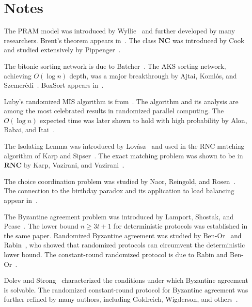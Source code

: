 \documentclass[twoside,12pt]{book}
\theoremstyle{plain}
\theoremstyle{definition}
\theoremstyle{remark}
\begin{document}


\section*{Notes}
\label{sec:parallel-notes}

\begin{enumerate}[label={[\arabic*]}]
\item The PRAM model was introduced by Wyllie~\cite{wyllie1979complexity} and further developed by many researchers. Brent's theorem appears in~\cite{brent1974parallel}. The class $\mathbf{NC}$ was introduced by Cook~\cite{cook1983parallel} and studied extensively by Pippenger~\cite{pippenger1979parallel}.
\item The bitonic sorting network is due to Batcher~\cite{batcher1968sorting}. The AKS sorting network, achieving $O(\log n)$ depth, was a major breakthrough by Ajtai, Koml\'{o}s, and Szemer\'{e}di~\cite{ajtai1983sorting}. BoxSort appears in~\cite{leighton1992introduction}.
\item Luby's randomized MIS algorithm is from~\cite{luby1986simple}. The algorithm and its analysis are among the most celebrated results in randomized parallel computing. The $O(\log n)$ expected time was later shown to hold with high probability by Alon, Babai, and Itai~\cite{alon1986fast}.
\item The Isolating Lemma was introduced by Lov\'{a}sz~\cite{lovasz1979deterministic} and used in the RNC matching algorithm of Karp and Sipser~\cite{karp1981maximum}. The exact matching problem was shown to be in $\mathbf{RNC}$ by Karp, Vazirani, and Vazirani~\cite{karp1990randomized}.
\item The choice coordination problem was studied by Naor, Reingold, and Rosen~\cite{naor1999randomized}. The connection to the birthday paradox and its application to load balancing appear in~\cite{naor1995choice}.
\item The Byzantine agreement problem was introduced by Lamport, Shostak, and Pease~\cite{lamport1982byzantine}. The lower bound $n \geq 3t + 1$ for deterministic protocols was established in the same paper. Randomized Byzantine agreement was studied by Ben-Or~\cite{benor1983another} and Rabin~\cite{rabin1983randomized}, who showed that randomized protocols can circumvent the deterministic lower bound. The constant-round randomized protocol is due to Rabin and Ben-Or~\cite{rabin1983randomized}.
\item Dolev and Strong~\cite{dolev1983short} characterized the conditions under which Byzantine agreement is solvable. The randomized constant-round protocol for Byzantine agreement was further refined by many authors, including Goldreich, Wigderson, and others~\cite{goldreich1998how}.
\end{enumerate}
\end{document}
